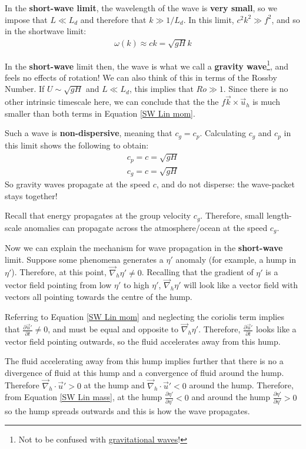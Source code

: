 In the \textbf{short-wave limit}, the wavelength of the wave is \textbf{very small}, so we impose that \(L\ll L_d\) and therefore that \(k \gg 1/L_d\). In this limit, \(c^2k^2\gg f^2\), and so in the shortwave limit:
\begin{align*}
    \boxed{\omega(k)\approx ck = \sqrt{gH}k}
\end{align*} 

In the \textbf{short-wave} limit then, the wave is what we call a \textbf{gravity wave}\footnote{Not to be confused with \href{https://en.wikipedia.org/wiki/Gravitational_wave}{gravitational waves}!}, and feels no effects of rotation! We can also think of this in terms of the Rossby Number. If \(U\sim\sqrt{g H}\) and \(L\ll L_d\), this implies that \(Ro\gg 1\). Since there is no other intrinsic timescale here, we can conclude that the the \(f\vec{k}\times\vec{u}_h\) is much smaller than both terms in Equation \ref{SW Lin mom}.

Such a wave is \textbf{non-dispersive}, meaning that \(c_g=c_p\). Calculating \(c_g\) and \(c_p\) in this limit shows the following to obtain:
\begin{align*}
    c_p = c=\sqrt{gH}\\
    c_g = c=\sqrt{gH}
\end{align*}
So gravity waves propagate at the speed \(c\), and do not disperse: the wave-packet stays together!

Recall that energy propagates at the group velocity \(c_g\). Therefore, small length-scale anomalies can propagate across the atmosphere/ocean at the speed \(c_g\). 

Now we can explain the mechanism for wave propagation in the \textbf{short-wave} limit. Suppose some phenomena generates a \(\eta'\) anomaly (for example, a hump in \(\eta'\)). Therefore, at this point, \(\vec{\nabla}_h \eta'\neq 0\). Recalling that the gradient of \(\eta'\) is a vector field pointing from low \(\eta'\) to high \(\eta'\), \(\vec{\nabla}_h \eta'\) will look like a vector field with vectors all pointing towards the centre of the hump.

Referring to Equation \ref{SW Lin mom} and neglecting the coriolis term implies that \(\frac{\partial \vec{u}'}{\partial t}\neq 0\), and must be equal and opposite to \(\vec{\nabla}_h \eta'\). Therefore, \(\frac{\partial \vec{u}'}{\partial t}\) looks like a vector field pointing outwards, so the fluid accelerates away from this hump.

The fluid accelerating away from this hump implies further that there is no a divergence of fluid at this hump and a convergence of fluid around the hump. Therefore \(\vec{\nabla}_h\cdot\vec{u}'>0\) at the hump and \(\vec{\nabla}_h\cdot\vec{u}'<0\) around the hump. Therefore, from Equation \ref{SW Lin mass}, at the hump \(\frac{\partial \eta'}{\partial \eta'}<0\) and around the hump \(\frac{\partial \eta'}{\partial \eta'}>0\) so the hump spreads outwards and this is how the wave propagates.

